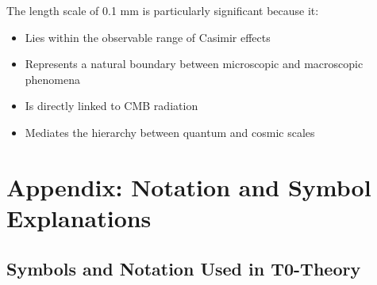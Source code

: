 \documentclass[12pt,a4paper]{article}
\numberwithin{equation}{section}
\begin{document}
	The length scale of 0.1 mm is particularly significant because it:
	\begin{itemize}
		\item Lies within the observable range of Casimir effects
		\item Represents a natural boundary between microscopic and macroscopic phenomena
		\item Is directly linked to CMB radiation
		\item Mediates the hierarchy between quantum and cosmic scales
	\end{itemize}
	
	\section*{Appendix: Notation and Symbol Explanations}
	
	\subsection*{Symbols and Notation Used in T0-Theory}
	
\end{document}
